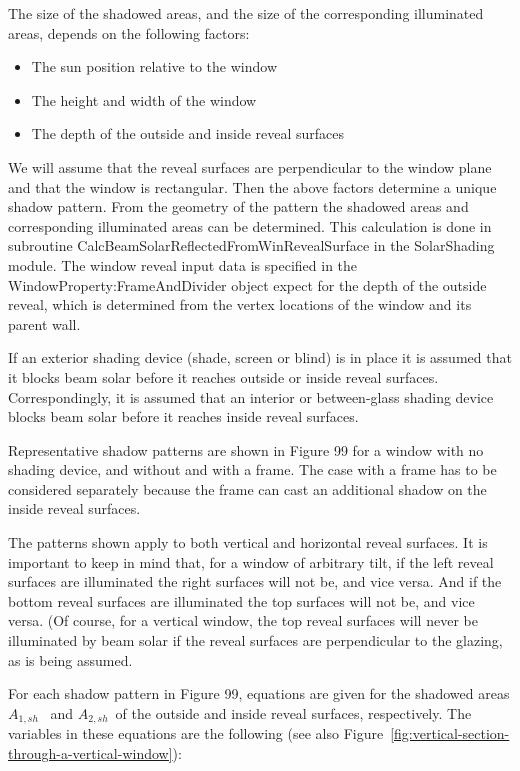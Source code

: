 The size of the shadowed areas, and the size of the corresponding illuminated areas, depends on the following factors:

\begin{itemize}
\item
  The sun position relative to the window
\item
  The height and width of the window
\item
  The depth of the outside and inside reveal surfaces
\end{itemize}

We will assume that the reveal surfaces are perpendicular to the window plane and that the window is rectangular. Then the above factors determine a unique shadow pattern. From the geometry of the pattern the shadowed areas and corresponding illuminated areas can be determined. This calculation is done in subroutine CalcBeamSolarReflectedFromWinRevealSurface in the SolarShading module. The window reveal input data is specified in the WindowProperty:FrameAndDivider object expect for the depth of the outside reveal, which is determined from the vertex locations of the window and its parent wall.

If an exterior shading device (shade, screen or blind) is in place it is assumed that it blocks beam solar before it reaches outside or inside reveal surfaces. Correspondingly, it is assumed that an interior or between-glass shading device blocks beam solar before it reaches inside reveal surfaces.

Representative shadow patterns are shown in Figure 99 for a window with no shading device, and without and with a frame. The case with a frame has to be considered separately because the frame can cast an additional shadow on the inside reveal surfaces.

The patterns shown apply to both vertical and horizontal reveal surfaces. It is important to keep in mind that, for a window of arbitrary tilt, if the left reveal surfaces are illuminated the right surfaces will not be, and vice versa. And if the bottom reveal surfaces are illuminated the top surfaces will not be, and vice versa. (Of course, for a vertical window, the top reveal surfaces will never be illuminated by beam solar if the reveal surfaces are perpendicular to the glazing, as is being assumed.

For each shadow pattern in Figure 99, equations are given for the shadowed areas \({A_{1,sh}}\) ~and \emph{\({A_{2,sh}}\)}~of the outside and inside reveal surfaces, respectively. The variables in these equations are the following (see also Figure~\ref{fig:vertical-section-through-a-vertical-window}):


